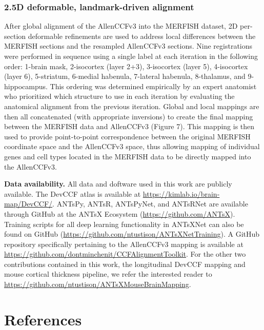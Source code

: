 \documentclass[
  12pt,
]{article}
\begin{document}
\hypertarget{d-deformable-landmark-driven-alignment}{%
\subsubsection{2.5D deformable, landmark-driven
alignment}\label{d-deformable-landmark-driven-alignment}}

After global alignment of the AllenCCFv3 into the MERFISH dataset, 2D
per-section deformable refinements are used to address local differences
between the MERFISH sections and the resampled AllenCCFv3 sections. Nine
registrations were performed in sequence using a single label at each
iteration in the following order: 1-brain mask, 2-isocortex (layer 2+3),
3-isocortex (layer 5), 4-isocortex (layer 6), 5-striatum, 6-medial
habenula, 7-lateral habenula, 8-thalamus, and 9-hippocampus. This
ordering was determined empirically by an expert anatomist who
prioritized which structure to use in each iteration by evaluating the
anatomical alignment from the previous iteration. Global and local
mappings are then all concatenated (with appropriate inversions) to
create the final mapping between the MERFISH data and AllenCCFv3 (Figure
7). This mapping is then used to provide point-to-point correspondence
between the original MERFISH coordinate space and the AllenCCFv3 space,
thus allowing mapping of individual genes and cell types located in the
MERFISH data to be directly mapped into the AllenCCFv3.

\clearpage
\newpage

\textbf{Data availability.} All data and doftware used in this work are
publicly available. The DevCCF atlas is available at
\url{https://kimlab.io/brain-map/DevCCF/}. ANTsPy, ANTsR, ANTsPyNet, and
ANTsRNet are available through GitHub at the ANTsX Ecosystem
(\url{https://github.com/ANTsX}). Training scripts for all deep learning
functionality in ANTsXNet can also be found on GitHub
(\url{https://github.com/ntustison/ANTsXNetTraining}). A GitHub
repository specifically pertaining to the AllenCCFv3 mapping is
available at \url{https://github.com/dontminchenit/CCFAlignmentToolkit}.
For the other two contributions contained in this work, the longitudinal
DevCCF mapping and mouse cortical thickness pipeline, we refer the
interested reader to
\url{https://github.com/ntustison/ANTsXMouseBrainMapping}.

\clearpage

\hypertarget{references}{%
\section*{References}\label{references}}
\end{document}
